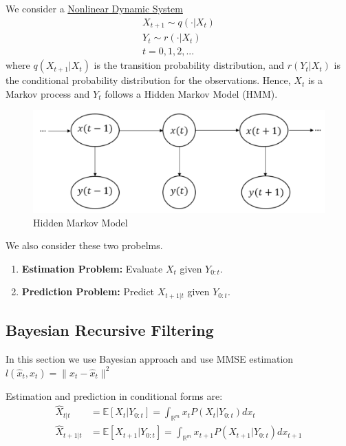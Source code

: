 \documentclass[11pt]{elegantbook}
\begin{document}
We consider a \underline{Nonlinear Dynamic System}
\begin{equation}
    \begin{aligned}
        X_{t+1}\sim q(\cdot|X_t)\\
        Y_{t}\sim r(\cdot|X_t)\\t=0,1,2,...
    \end{aligned}
    \nonumber
\end{equation}
where $q(X_{t+1}|X_t)$ is the transition probability distribution, and $r(Y_t|X_t)$ is the conditional probability distribution for the observations. Hence, $X_t$ is a Markov process and $Y_t$ follows a Hidden Markov Model (HMM).
\begin{center}\begin{figure}[htbp]
    \centering
    \includegraphics[scale=0.2]{HMM.png}
    \caption{Hidden Markov Model}
    \label{}
\end{figure}\end{center}
We also consider these two probelms.
\begin{enumerate}
    \item \textbf{Estimation Problem:} Evaluate $X_t$ given $Y_{0:t}$.
    \item \textbf{Prediction Problem:} Predict $X_{t+1|t}$ given $Y_{0:t}$.
\end{enumerate}

\subsection{Bayesian Recursive Filtering}
In this section we use Bayesian approach and use MMSE estimation $l(\hat{x}_t,x_t)=\|x_t-\hat{x}_t\|^2$

Estimation and prediction in conditional forms are:
\begin{equation}
    \begin{aligned}
        \hat{X}_{t|t}&=\mathbb{E}[X_{t}|Y_{0:t}]=\int_{\mathbb{R}^m}x_{t}P(X_{t}|Y_{0:t})dx_{t}\\
        \hat{X}_{t+1|t}&=\mathbb{E}[X_{t+1}|Y_{0:t}]=\int_{\mathbb{R}^m}x_{t+1}P(X_{t+1}|Y_{0:t})dx_{t+1}
    \end{aligned}
    \nonumber
\end{equation}
\end{document}

